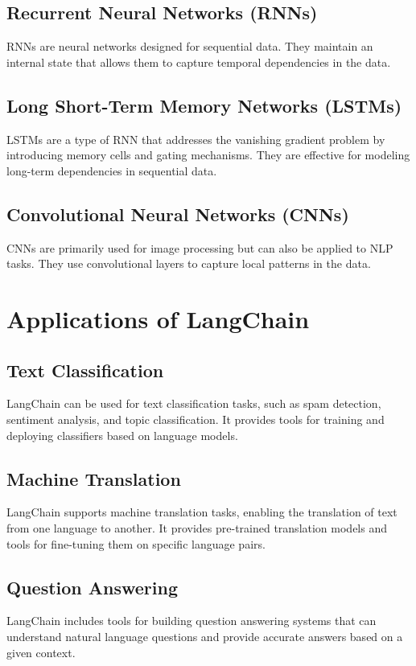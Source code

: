 \subsection{Recurrent Neural Networks (RNNs)}
RNNs are neural networks designed for sequential data. They maintain an internal state that allows them to capture temporal dependencies in the data.

\subsection{Long Short-Term Memory Networks (LSTMs)}
LSTMs are a type of RNN that addresses the vanishing gradient problem by introducing memory cells and gating mechanisms. They are effective for modeling long-term dependencies in sequential data.

\subsection{Convolutional Neural Networks (CNNs)}
CNNs are primarily used for image processing but can also be applied to NLP tasks. They use convolutional layers to capture local patterns in the data.

\section{Applications of LangChain}

\subsection{Text Classification}
LangChain can be used for text classification tasks, such as spam detection, sentiment analysis, and topic classification. It provides tools for training and deploying classifiers based on language models.

\subsection{Machine Translation}
LangChain supports machine translation tasks, enabling the translation of text from one language to another. It provides pre-trained translation models and tools for fine-tuning them on specific language pairs.

\subsection{Question Answering}
LangChain includes tools for building question answering systems that can understand natural language questions and provide accurate answers based on a given context.

